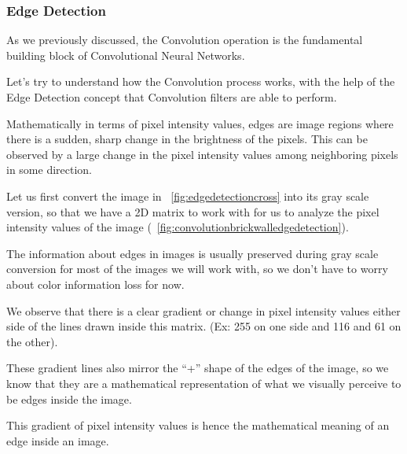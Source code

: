 	\subsubsection{Edge Detection}
	\begin{bulletedlist}
		\item As we previously discussed, the Convolution operation is the fundamental building block of Convolutional Neural Networks.

		\item Let's try to understand how the Convolution process works, with the help of the Edge Detection concept that Convolution filters are able to perform.
		\item Mathematically in terms of pixel intensity values, edges are image regions where there is a sudden, sharp change in the brightness of the pixels. This can be observed by a large change in the pixel intensity values among neighboring pixels in some direction.
		\item Let us first convert the image in \figurename~\ref{fig:edgedetectioncross} into its gray scale version, so that we have a 2D matrix to work with for us to analyze the pixel intensity values of the image (\figurename~\ref{fig:convolutionbrickwalledgedetection}).
		\item The information about edges in images is usually preserved during gray scale conversion for most of the images we will work with, so we don't have to worry about color information loss for now.
		\item We observe that there is a clear gradient or change in pixel intensity values either side of the lines drawn inside this matrix. (Ex: 255 on one side and 116 and 61 on the other).
		\item These gradient lines also mirror the ``+'' shape of the edges of the image, so we know that they are a mathematical representation of what we visually perceive to be edges inside the image.
		\item This gradient of pixel intensity values is hence the mathematical meaning of an edge inside an image.
		\begin{bulletedlist}
			\item
		\end{bulletedlist}
	\end{bulletedlist}

